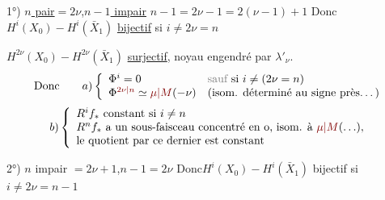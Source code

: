 1°) \uline{$n$ pair}$=2\nu$,\quad \uline{$n-1$ impair}
\qquad $n-1=2\nu-1=2(\nu-1)+1$
\diagram{\[
\left.\begin{array}{ll}
H^*(X_0):&
1,\xi_0,\ldots,\xi_0^{\nu-1},
[\xi_0^\nu,\lambda'_\nu],\frac12\xi_0^{\nu+1},\ldots,\frac12\xi_0^{2\nu-1}\\[5pt]
H^*(\bar X_1):&
1,\xi_1,\ldots,\xi_1^{\nu-1},
\frac12\xi_1^\nu,\frac12\unsure{\xi_1^{\nu+1}},\ldots,\frac12\xi_1^{2\nu-1}
\end{array}\right]
\quad
\begin{array}{l}\xi_0\rightsquigarrow\xi_1\\\lambda'_\nu\rightsquigarrow0\end{array}
\]}
Donc\quad $H^i(X_0)\mathbin{-}H^i(\bar X_1)$
\uline{bijectif}  si $i\ne2\nu=n$

$H^{2\nu}(X_0)\mathbin{-}H^{2\nu}(\bar X_1)$
\uline{surjectif}, noyau engendré par $\lambda'_\nu$.
\[
\text{Donc}\qquad
a)\left\{\begin{array}{ll}
\Phi^i=0&\deleted{\text{sauf}}\ \text{si }i\ne(2\nu=n)\\
\Phi^{\unsure{2\nu|n}}\simeq\unsure{\mu|M}(-\nu)&
\text{(isom. déterminé au signe près\ldots)}
\end{array}\right.
\]
\[
b)\left\{\begin{array}{l}
R^if_*\text{ constant si }i\ne n\\
R^nf_*\text{ a un sous-faisceau concentré en o, isom. à }\unsure{\mu|M}(\ldots),\\
\text{le quotient par ce dernier est constant}
\end{array}\right.
\]

2°) $n$ impair $=2\nu+1$,\qquad $n-1=2\nu$
\diagram{\[
\left.\begin{array}{ll}
H^*(X_0):&
1,\xi_0,\ \xi_0^{\nu-1},\ \xi_0^\nu,\ \frac12\xi_0^{\nu+1},
\ldots,\frac12\xi_0^{2\nu}\\[5pt]
H^*(\bar X_1):&
1,\xi_1,\ldots,\xi_1^{\nu-1},[\xi_1^\nu,\lambda_\nu],
\frac12\xi_1^{\nu+1},\ldots,\frac12\xi_1^{2\nu}
\end{array}\right]
\quad\xi_0\rightsquigarrow\xi_1
\]}
Donc\quad $H^i(X_0)\mathbin{-}H^i(\bar X_1)$ bijectif si $i\ne2\nu=n-1$

